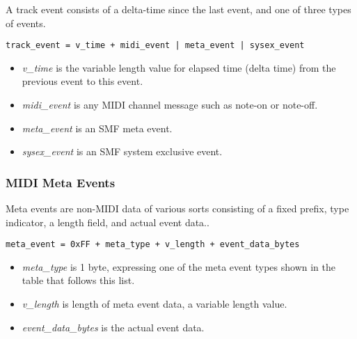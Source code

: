    A track event consists of a delta-time since the last event, and one of
   three types of events.
 
   \texttt{track\_event = v\_time + midi\_event | meta\_event | sysex\_event}
 
   \begin{itemize}
      \item \textsl{v\_time} is the variable length value for elapsed time
         (delta time) from the previous event to this event.
      \item \textsl{midi\_event} is any MIDI channel message such as note-on
         or note-off.
      \item \textsl{meta\_event} is an SMF meta event.
      \item \textsl{sysex\_event} is an SMF system exclusive event.
   \end{itemize}

\subsubsection{MIDI Meta Events}
\label{subsubsec:midi_meta_events}

   Meta events are non-MIDI data of various sorts consisting of a fixed prefix,
   type indicator, a length field, and actual event data..
 
   \texttt{meta\_event = 0xFF + meta\_type + v\_length + event\_data\_bytes}

   \begin{itemize}
      \item \textsl{meta\_type} is 1 byte, expressing one of the meta event
         types shown in the table that follows this list.
      \item \textsl{v\_length} is length of meta event data, a variable
         length value.
      \item \textsl{event\_data\_bytes} is the actual event data.
   \end{itemize}

